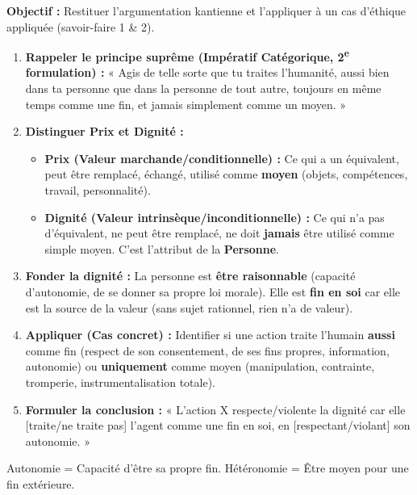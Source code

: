 \documentclass[11pt]{article}
\newcommand{\cle}[1]{{\popxbold\color{popdark}#1}}
\begin{document}
\begin{methode}
\textbf{Objectif :} Restituer l'argumentation kantienne et l'appliquer à un cas d'éthique appliquée (savoir-faire 1 \& 2).
\begin{enumerate}
    \item \textbf{Rappeler le principe suprême (Impératif Catégorique, 2\textsuperscript{e} formulation) :} « Agis de telle sorte que tu traites l'humanité, aussi bien dans ta personne que dans la personne de tout autre, toujours en même temps comme une fin, et jamais simplement comme un moyen. »
    \item \textbf{Distinguer \cle{Prix} et \cle{Dignité} :}
    \begin{itemize}
        \item \textbf{Prix (Valeur marchande/conditionnelle) :} Ce qui a un équivalent, peut être remplacé, échangé, utilisé comme \textbf{moyen} (objets, compétences, travail, personnalité).
        \item \textbf{Dignité (Valeur intrinsèque/inconditionnelle) :} Ce qui n'a pas d'équivalent, ne peut être remplacé, ne doit \textbf{jamais} être utilisé comme simple moyen. C'est l'attribut de la \textbf{Personne}.
    \end{itemize}
    \item \textbf{Fonder la dignité :} La personne est \textbf{être raisonnable} (capacité d'autonomie, de se donner sa propre loi morale). Elle est \textbf{fin en soi} car elle est la source de la valeur (sans sujet rationnel, rien n'a de valeur).
    \item \textbf{Appliquer (Cas concret) :} Identifier si une action traite l'humain \textbf{aussi} comme fin (respect de son consentement, de ses fins propres, information, autonomie) ou \textbf{uniquement} comme moyen (manipulation, contrainte, tromperie, instrumentalisation totale).
    \item \textbf{Formuler la conclusion :} « L'action X respecte/violente la dignité car elle [traite/ne traite pas] l'agent comme une fin en soi, en [respectant/violant] son autonomie. »
\end{enumerate}
\cle{Autonomie = Capacité d'être sa propre fin. Hétéronomie = Être moyen pour une fin extérieure.}
\end{methode}
\end{document}
